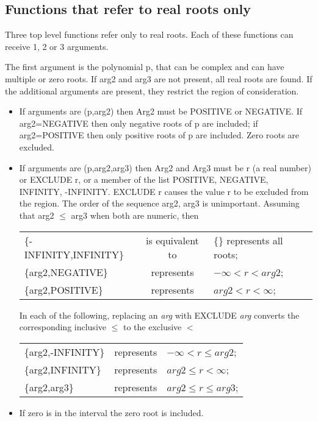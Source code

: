 \subsection{Functions that refer to real roots only}

Three top level functions refer only to real roots.  Each of these
functions can receive 1, 2 or 3 arguments.

The first argument is the polynomial p, that can be complex and can
have multiple or zero roots.  If arg2 and arg3 are not present, all real
roots are found.  If the additional arguments are present, they restrict
the region of consideration.
                                                    
\begin{itemize}
\item If arguments are (p,arg2) then
Arg2 must be POSITIVE or NEGATIVE.  If arg2=NEGATIVE then only
negative roots of p are included; if arg2=POSITIVE then only positive
roots of p are included. Zero roots are excluded.

\item If arguments are (p,arg2,arg3) then
   
Arg2 and Arg3 must be r (a real number) or  EXCLUDE r,  or a member of
the list POSITIVE, NEGATIVE, INFINITY, -INFINITY.  EXCLUDE r causes the
value r to be excluded from the region.  The order of the sequence
arg2, arg3 is unimportant.  Assuming that arg2 $\leq$ arg3 when both are
numeric, then

\begin{tabular}{l c l}
\{-INFINITY,INFINITY\} & is equivalent to & \{\} represents all roots; \\
\{arg2,NEGATIVE\} & represents & $-\infty < r < arg2$; \\
\{arg2,POSITIVE\} & represents & $arg2 < r < \infty$;
\end{tabular}

In each of the following, replacing an {\em arg} with EXCLUDE {\em arg}
converts the corresponding inclusive $\leq$ to the exclusive $<$

\begin{tabular}{l c l}
\{arg2,-INFINITY\} & represents & $-\infty < r \leq arg2$; \\
\{arg2,INFINITY\} & represents & $arg2 \leq r < \infty$; \\
\{arg2,arg3\} & represents & $arg2 \leq r \leq arg3$;
\end{tabular}

\item If zero is in the interval the zero root is included.
\end{itemize}

